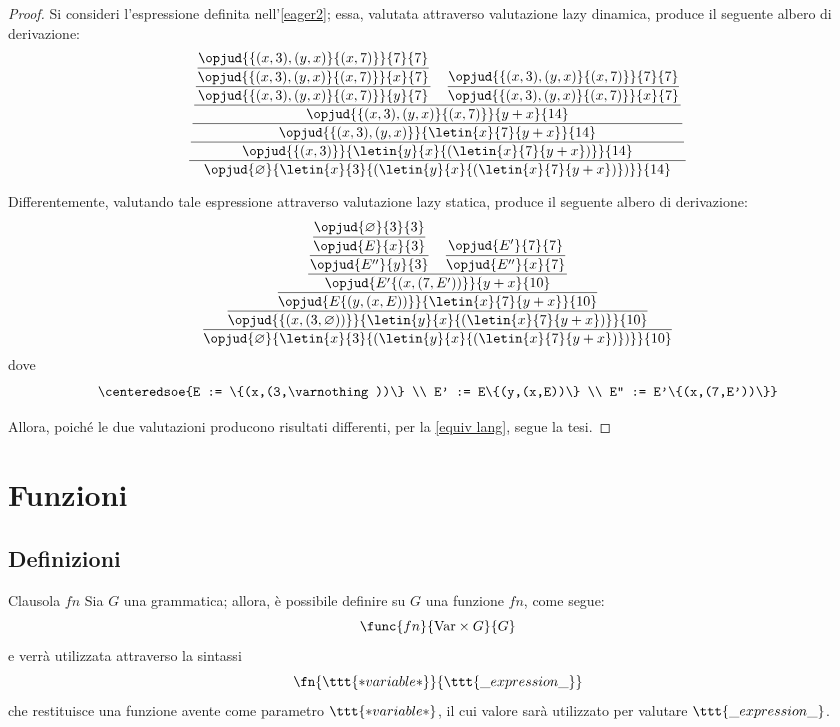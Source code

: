 \documentclass[a4paper, 12pt]{report}
\begin{document}
    \begin{proof}
        Si consideri l'espressione definita nell'\cref{eager2}; essa, valutata attraverso valutazione lazy dinamica, produce il seguente albero di derivazione: $$\dfrac{\dfrac{\dfrac{\dfrac{\dfrac{\dfrac{\opjud{\{(x,3),(y,x)\}\{(x,7)\}}{7}{7}}{\opjud{\{(x,3),(y,x)\}\{(x,7)\}}{x}{7}}}{\opjud{\{(x,3),(y,x)\}\{(x,7)\}}{y}{7}} \quad \dfrac{\opjud{\{(x,3),(y,x)\}\{(x,7)\}}{7}{7}}{\opjud{\{(x,3),(y,x)\}\{(x,7)\}}{x}{7}}}{\opjud{\{(x,3),(y,x)\}\{(x,7)\}}{y+x}{14}}}{\opjud{\{(x,3),(y,x)\}}{\letin{x}{7}{y+x}}{14}}}{\opjud{\{(x,3)\}}{\letin{y}{x}{(\letin{x}{7}{y+x})}}{14}}}{\opjud{\varnothing}{\letin{x}{3}{(\letin{y}{x}{(\letin{x}{7}{y+x})})}}{14}}$$

        Differentemente, valutando tale espressione attraverso valutazione lazy statica, produce il seguente albero di derivazione: $$\dfrac{\dfrac{\dfrac{\dfrac{\dfrac{\dfrac{\opjud{\varnothing}{3}{3}}{\opjud{E}{x}{3}}}{\opjud{E''}{y}{3}} \quad \dfrac{\opjud{E'}{7}{7}}{\opjud{E''}{x}{7}}}{\opjud{E'\{(x,(7,E'))\}}{y+x}{10}}}{\opjud{E\{(y,(x, E))\}}{\letin{x}{7}{y+x}}{10}}}{\opjud{\{(x,(3,\varnothing))\}}{\letin{y}{x}{(\letin{x}{7}{y+x})}}{10}}}{\opjud{\varnothing}{\letin{x}{3}{(\letin{y}{x}{(\letin{x}{7}{y+x})})}}{10}}$$ dove $$\centeredsoe{E := \{(x,(3,\varnothing))\} \\ E' := E\{(y,(x,E))\} \\ E'' := E'\{(x,(7,E'))\}}$$

        Allora, poiché le due valutazioni producono risultati differenti, per la \cref{equiv lang}, segue la tesi.
    \end{proof}

    \section{Funzioni}

    \subsection{Definizioni}

    \begin{frameddefn}[label={fn}]{Clausola $fn$}
        Sia $G$ una grammatica; allora, è possibile definire su $G$ una funzione $fn$, come segue: $$\func{fn}{\mathrm{Var} \times G}{G}$$ e verrà utilizzata attraverso la sintassi $$\fn{\ttt{*variable*}}{\ttt{\_expression\_}}$$ che restituisce una funzione avente come parametro $\ttt{*variable*}$, il cui valore sarà utilizzato per valutare $\ttt{\_expression\_}$.
    \end{frameddefn}
\end{document}
